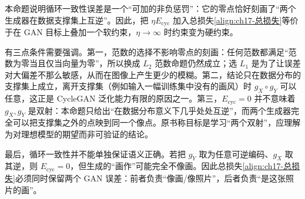\documentclass[../../main.tex]{subfiles}
\begin{document}
\begin{remark}
本命题说明循环一致性误差是一个“可加的非负惩罚”：它的零点恰好刻画了“两个生成器在数据支撑集上互逆”。因此，把 $\eta E_{\mathrm{cyc}}$ 加入总损失\eqref{align:ch17-总损失}等价于在 GAN 目标上叠加一个软约束，$\eta\to\infty$ 时约束变为硬约束。

有三点条件需要强调。第一，范数的选择不影响零点的刻画：任何范数都满足“范数为零当且仅当向量为零”，所以换成 $L_2$ 范数命题仍然成立；选 $L_1$ 是为了让误差对大偏差不那么敏感，从而在图像上产生更少的模糊。第二，结论只在数据分布的支撑集上成立，离开支撑集（例如输入一幅训练集中没有的画风）时 $g_X\circ g_Y$ 可以任意，这正是 CycleGAN 泛化能力有限的原因之一。第三，$E_{\mathrm{cyc}}=0$ 并不意味着 $g_X,g_Y$ 是双射：本命题只给出“在数据分布意义下几乎处处互逆”，而两个生成器完全可以把支撑集之外的点映到同一个像点。原书称目标是学习“两个双射”，应理解为对理想模型的期望而非可验证的结论。

最后，循环一致性并不能单独保证语义正确。若把 $g_Y$ 取为任意可逆编码、$g_X$ 取其逆，则 $E_{\mathrm{cyc}}=0$，但生成的“画作”可能完全不像画。因此总损失\eqref{align:ch17-总损失}必须同时保留两个 GAN 误差：前者负责“像画/像照片”，后者负责“是这张照片的画”。
\end{remark}
\end{document}
